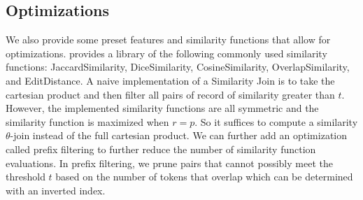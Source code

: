 \subsection{Optimizations}
We also provide some preset features and similarity functions that allow for optimizations.
\projx provides a library of the following commonly used similarity functions: \textsf{JaccardSimilarity}, \textsf{DiceSimilarity},
\textsf{CosineSimilarity}, \textsf{OverlapSimilarity}, and \textsf{EditDistance}.
A naive implementation of a Similarity Join is to take the cartesian product and then filter all pairs of record of similarity greater than $t$.
However, the implemented similarity functions are all symmetric and the similarity function is maximized when $r = p$.
So it suffices to compute a similarity $\theta$-join instead of the full cartesian product.
We can further add an optimization called prefix filtering to further reduce the number of similarity function evaluations.
In prefix filtering, we prune pairs that cannot possibly meet the threshold $t$ based on the number of tokens that overlap which can be determined with an inverted index.






